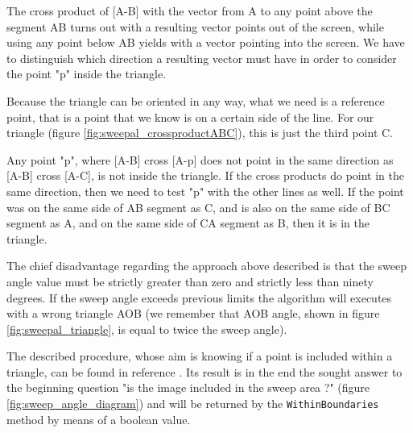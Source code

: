 %
The cross product of [A-B] with the vector from A to any point above the segment AB turns out with a resulting vector
points out of the screen, while using any point below AB yields with a vector pointing into the screen. We have to
distinguish which direction a resulting vector must have in order to consider the point "p" inside the triangle.
%

%
Because the triangle can be oriented in any way, what we need is a reference point, that is a point that we know is
on a certain side of the line. For our triangle (figure \ref{fig:sweepal_crossproductABC}), this is just the third
point C.
%

%
Any point "p", where [A-B] cross [A-p] does not point in the same direction as [A-B] cross [A-C], is not inside the
triangle. If the cross products do point in the same direction, then we need to test "p" with the other lines as well.
If the point was on the same side of AB segment as C, and is also on the same side of BC segment as A, and on the same
side of CA segment as B, then it is in the triangle.
%

%
The chief disadvantage regarding the approach above described is that the sweep angle value must be strictly greater
than zero and strictly less than ninety degrees. If the sweep angle exceeds previous limits the algorithm will executes
with a wrong triangle AOB (we remember that AOB angle, shown in figure \ref{fig:sweepal_triangle}, is equal to twice
the sweep angle).
%

%
The described procedure, whose aim is knowing if a point is included within a triangle, can be found in reference
\cite{withinboundaries:pointintriangle}. Its result is in the end the sought answer to the beginning question "is the
image included in the sweep area ?" (figure \ref{fig:sweep_angle_diagram}) and will be returned by the
\texttt{WithinBoundaries} method by means of a boolean value.
%
